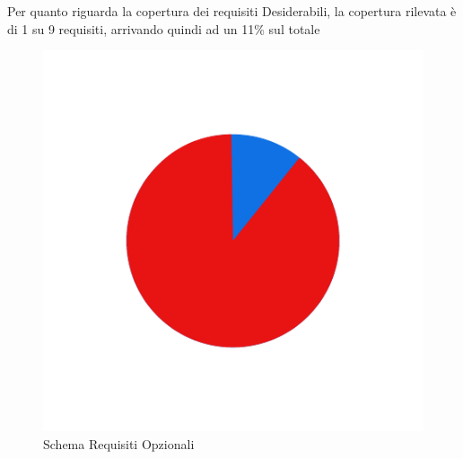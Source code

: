 \newpage

Per quanto riguarda la copertura dei requisiti Desiderabili, la copertura rilevata è di 1 su 9
requisiti, arrivando quindi ad un 11\% sul totale
\begin{figure}[H]
    \centering
    \includegraphics[width=\textwidth]{images/requisiti_op.png}
    \caption{Schema Requisiti Opzionali}
    \label{fig:Requisiti Opzionali}
\end{figure}





